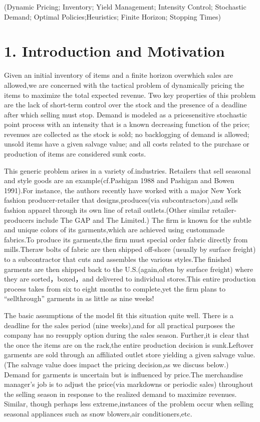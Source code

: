 (Dynamic Pricing; Inventory; Yield Management; Intensity Control;
Stochastic Demand; Optimal Policies;Heuristics; Finite Horizon; Stopping
Times)

\section{1. Introduction and
Motivation}\label{introduction-and-motivation}

Given an initial inventory of items and a finite horizon overwhich sales
are allowed,we are concerned with the tactical problem of dynamically
pricing the items to maximize the total expected revenue. Two key
properties of this problem are the lack of short-term control over the
stock and the presence of a deadline after which selling must stop.
Demand is modeled as a pricesensitive stochastic point process with an
intensity that is a known decreasing function of the price; revenues are
collected as the stock is sold; no backlogging of demand is allowed;
unsold items have a given salvage value; and all costs related to the
purchase or production of items are considered sunk costs.

This generic problem arises in a variety of.industries. Retailers that
sell seasonal and style goods are an example(cf.Pashigan 1988 and
Pashigan and Bowen 1991).For instance, the authors recently have worked
with a major New York fashion producer-retailer that
designs,produces(via subcontractors),and sells fashion apparel through
its own line of retail outlets.(Other similar retailer-producers include
The GAP and The Limited.) The firm is known for the subtle and unique
colors of its garments,which are achieved using custommade fabrics.To
produce its garments,the firm must special order fabric directly from
mills.Theraw bolts of fabric are then shipped off-shore (usually by
surface freight) to a subcontractor that cuts and assembles the various
styles.The finished garments are then shipped back to the
U.S.(again,often by surface freight) where they are sorted，boxed，and
delivered to individual stores.This entire production process takes from
six to eight months to complete,yet the firm plans to ``sellthrough''
garments in as little as nine weeks!

The basic assumptions of the model fit this situation quite well. There
is a deadline for the sales period (nine weeks),and for all practical
purposes the company has no resupply option during the sales season.
Further,it is clear that the once the items are on the rack,the entire
production decision is sunk.Leftover garments are sold through an
affiliated outlet store yielding a given salvage value.(The salvage
value does impact the pricing decision,as we discuss below.) Demand for
garments is uncertain but is influenced by price.The merchandise
manager's job is to adjust the price(via markdowns or periodic sales)
throughout the selling season in response to the realized demand to
maximize revenues. Similar, though perhaps less extreme,instances of the
problem occur when selling seasonal appliances such as snow blowers,air
conditioners,etc.

